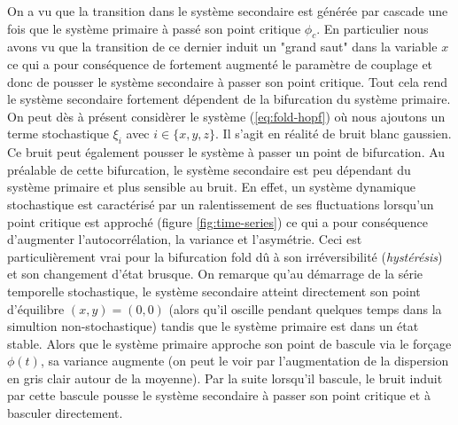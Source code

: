 
On a vu que la transition dans le système secondaire est générée par cascade une fois que le système primaire à passé son point critique $\phi_c$. En particulier nous avons vu que la transition de ce dernier induit un "grand saut" dans la variable $x$ ce qui a pour conséquence de fortement augmenté le paramètre de couplage et donc de pousser le système secondaire à passer son point critique. Tout cela rend le système secondaire fortement dépendent de la bifurcation du système primaire.
On peut dès à présent considèrer le système (\ref{eq:fold-hopf}) où nous ajoutons un terme stochastique $\xi_i$ avec $i \in \{x, y, z\}$. Il s'agit en réalité de bruit blanc gaussien. Ce bruit peut également pousser le système à passer un point de bifurcation.
Au préalable de cette bifurcation, le système secondaire est peu dépendant du système primaire et plus sensible au bruit. En effet, un système dynamique stochastique est caractérisé par un ralentissement de ses fluctuations lorsqu'un point critique est approché (figure \ref{fig:time-series}) ce qui a pour conséquence d'augmenter l'autocorrélation, la variance et l'asymétrie. Ceci est particulièrement vrai pour la bifurcation fold dû à son irréversibilité (\emph{hystérésis}) et son changement d'état brusque. On remarque qu'au démarrage de la série temporelle stochastique, le système secondaire atteint directement son point d'équilibre $(x,y) = (0,0)$ (alors qu'il oscille pendant quelques temps dans la simultion non-stochastique) tandis que le système primaire est dans un état stable. Alors que le système primaire approche son point de bascule via le forçage $\phi(t)$, sa variance augmente (on peut le voir par l'augmentation de la dispersion en gris clair autour de la moyenne). Par la suite lorsqu'il bascule, le bruit induit par cette bascule pousse le système secondaire à passer son point critique et à basculer directement.
